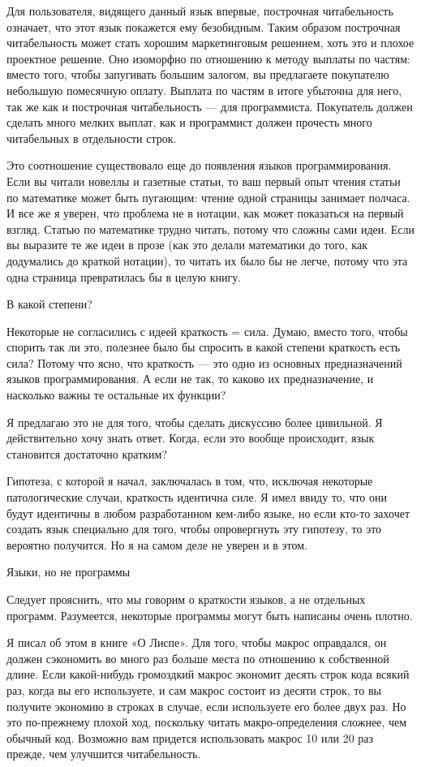\documentclass[ebook,12pt,oneside,openany]{memoir}
\begin{document}
Для пользователя, видящего данный язык впервые, построчная
читабельность означает, что этот язык покажется ему безобидным. Таким
образом построчная читабельность может стать хорошим маркетинговым
решением, хоть это и плохое проектное решение. Оно изоморфно по
отношению к методу выплаты по частям: вместо того, чтобы запугивать
большим залогом, вы предлагаете покупателю небольшую помесячную
оплату. Выплата по частям в итоге убыточна для него, так же как и
построчная читабельность — для программиста. Покупатель должен сделать
много мелких выплат, как и программист должен прочесть много
читабельных в отдельности строк.

Это соотношение существовало еще до появления языков программирования.
Если вы читали новеллы и газетные статьи, то ваш первый опыт чтения
статьи по математике может быть пугающим: чтение одной страницы
занимает полчаса. И все же я уверен, что проблема не в нотации, как
может показаться на первый взгляд. Статью по математике трудно читать,
потому что сложны сами идеи. Если вы выразите те же идеи в прозе (как
это делали математики до того, как додумались до краткой нотации), то
читать их было бы не легче, потому что эта одна страница превратилась
бы в целую книгу.

В какой степени?

Некоторые не согласились с идеей краткость = сила. Думаю, вместо того,
чтобы спорить так ли это, полезнее было бы спросить в какой степени
краткость есть сила? Потому что ясно, что краткость — это одно из
основных предназначений языков программирования. А если не так, то
каково их предназначение, и насколько важны те остальные их функции?

Я предлагаю это не для того, чтобы сделать дискуссию более цивильной.
Я действительно хочу знать ответ. Когда, если это вообще происходит,
язык становится достаточно кратким?

Гипотеза, с которой я начал, заключалась в том, что, исключая
некоторые патологические случаи, краткость идентична силе. Я имел
ввиду то, что они будут идентичны в любом разработанном кем-либо
языке, но если кто-то захочет создать язык специально для того, чтобы
опровергнуть эту гипотезу, то это вероятно получится. Но я на самом
деле не уверен и в этом.

Языки, но не программы

Следует прояснить, что мы говорим о краткости языков, а не отдельных
программ. Разумеется, некоторые программы могут быть написаны очень
плотно.

Я писал об этом в книге «О Лиспе». Для того, чтобы макрос оправдался,
он должен сэкономить во много раз больше места по отношению к
собственной длине. Если какой-нибудь громоздкий макрос экономит десять
строк кода всякий раз, когда вы его используете, и сам макрос состоит
из десяти строк, то вы получите экономию в строках в случае, если
используете его более двух раз. Но это по-прежнему плохой ход,
поскольку читать макро-определения сложнее, чем обычный код. Возможно
вам придется использовать макрос 10 или 20 раз прежде, чем улучшится
читабельность.
\end{document}
